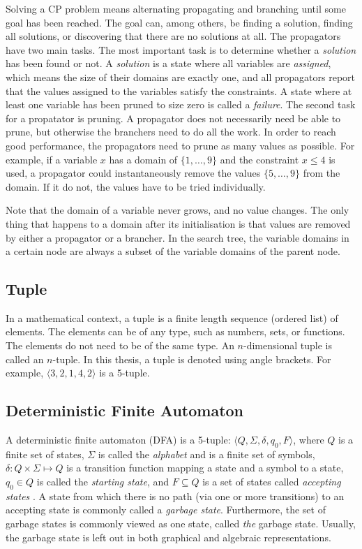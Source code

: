 \documentclass[a4paper,11pt]{article}
\begin{document}
Solving a CP problem means alternating propagating and branching until some goal has been reached. The goal can, among others, be finding a solution, finding all solutions, or discovering that there are no solutions at all. The propagators have two main tasks. The most important task is to determine whether a \textit{solution} has been found or not. A \textit{solution} is a state where all variables are \textit{assigned}, which means the size of their domains are exactly one, and all propagators report that the values assigned to the variables satisfy the constraints. A state where at least one variable has been pruned to size zero is called a \textit{failure}. The second task for a propatator is pruning. A propagator does not necessarily need be able to prune, but otherwise the branchers need to do all the work. In order to reach good performance, the propagators need to prune as many values as possible. For example, if a variable $x$ has a domain of $\{1,\ldots,9\}$ and the constraint $x\le 4$ is used, a propagator could instantaneously remove the values $\{5,\ldots,9\}$ from the domain. If it do not, the values have to be tried individually.

Note that the domain of a variable never grows, and no value changes. The only thing that happens to a domain after its initialisation is that values are removed by either a propagator or a brancher. In the search tree, the variable domains in a certain node are always a subset of the variable domains of the parent node. 

\subsection{Tuple}
In a mathematical context, a tuple is a finite length sequence (ordered list) of elements. The elements can be of any type, such as numbers, sets, or functions. The elements do not need to be of the same type. An $n$-dimensional tuple is called an $n$-tuple. In this thesis, a tuple is denoted using angle brackets. For example, $\langle 3, 2, 1, 4, 2 \rangle$ is a 5-tuple. 

\subsection{Deterministic Finite Automaton}
\label{sec:dfa}
A deterministic finite automaton (DFA) is a 5-tuple: $\langle Q,\Sigma,\delta,q_0, F\rangle$, where $Q$ is a finite set of states, $\Sigma$ is called the \textit{alphabet} and is a finite set of symbols, $\delta : Q \times \Sigma \mapsto Q$  is a transition function mapping a state and a symbol to a state, $q_0\in Q$ is called the \textit{starting state}, and $F\subseteq Q$  is a set of states called \textit{accepting states} \cite{hopcroft2001introduction}. A state from which there is no path (via one or more transitions) to an accepting state is commonly called a \textit{garbage state}. Furthermore, the set of garbage states is commonly viewed as one state, called \textit{the} garbage state. Usually, the garbage state is left out in both graphical and algebraic representations. 
\end{document}
